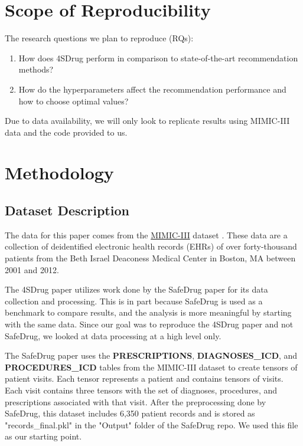\documentclass[letterpaper]{article} %
\begin{document}
\section{Scope of Reproducibility}

The research questions we plan to reproduce (RQs):
\begin{enumerate}
\item How does 4SDrug perform in comparison to state-of-the-art recommendation
methods?
\item How do the hyperparameters affect the recommendation performance and how to choose optimal values? \cite{4sdrug}
\end{enumerate}
Due to data availability, we will only look to replicate results using MIMIC-III data and the code provided to us. 


\section{Methodology}
\subsection{Dataset Description} \label{dd}
The data for this paper comes from the \href{https://physionet.org/content/mimiciii/1.4/}{MIMIC-III} dataset \cite{mimiciii}. These data are a collection of deidentified electronic health records (EHRs) of over forty-thousand patients from the Beth Israel Deaconess Medical Center in Boston, MA between 2001 and 2012.

The 4SDrug paper utilizes work done by the SafeDrug paper \cite{yang2021safedrug} for its data collection and processing. This is in part because SafeDrug is used as a benchmark to compare results, and the analysis is more meaningful by starting with the same data. Since our goal was to reproduce the 4SDrug paper and not SafeDrug, we looked at data processing at a high level only. 

The SafeDrug paper uses the \textbf{PRESCRIPTIONS}, \textbf{DIAGNOSES\_ICD}, and \textbf{PROCEDURES\_ICD} tables from the MIMIC-III dataset to create tensors of patient visits. Each tensor represents a patient and contains tensors of visits. Each visit contains three tensors with the set of diagnoses, procedures, and prescriptions associated with that visit. After the preprocessing done by SafeDrug, this dataset includes 6,350 patient records and is stored as "records\_final.pkl" in the "Output" folder of the SafeDrug repo. We used this file as our starting point.
\end{document}
